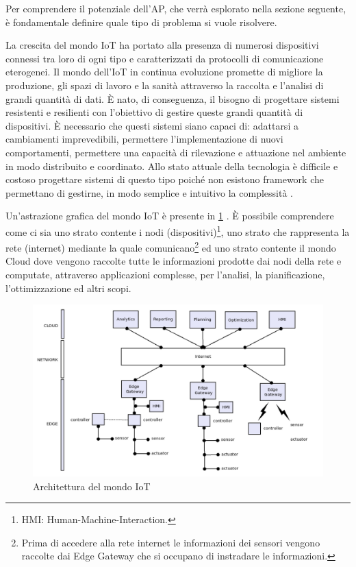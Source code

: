 \documentclass[12pt,a4paper,openright,twoside]{book}
\begin{document}
Per comprendere il potenziale dell'\ac{AP}, che verrà esplorato nella sezione seguente, è fondamentale definire quale tipo di problema si vuole risolvere. 

La crescita del mondo \ac{IoT} ha portato alla presenza di numerosi dispositivi connessi tra loro di ogni tipo e caratterizzati da protocolli di comunicazione eterogenei. Il mondo dell'IoT in continua evoluzione promette di migliore la produzione, gli spazi di lavoro e la sanità attraverso la raccolta e l'analisi di grandi quantità di dati. È nato, di conseguenza, il bisogno di progettare sistemi resistenti e resilienti con l'obiettivo di gestire queste grandi quantità di dispositivi. È necessario che questi sistemi siano capaci di: adattarsi a cambiamenti imprevedibili, permettere l'implementazione di nuovi comportamenti, permettere una capacità di rilevazione e attuazione nel ambiente in modo distribuito e coordinato. Allo stato attuale della tecnologia è difficile e costoso progettare sistemi di questo tipo poiché non esistono framework che permettano di gestirne, in modo semplice e intuitivo la complessità \cite{Beal2015} \cite{CasadeiPhDThesis}.

Un'astrazione grafica del mondo IoT è presente in \cref{fig:iot-arc} \cite{Testa2022}. È possibile comprendere come ci sia uno strato contente i nodi (dispositivi)\footnote{HMI: Human-Machine-Interaction.}, uno strato che rappresenta la rete (internet) mediante la quale comunicano\footnote{Prima di accedere alla rete internet le informazioni dei sensori vengono raccolte dai Edge Gateway che si occupano di instradare le informazioni.} ed uno strato contente il mondo Cloud dove vengono raccolte tutte le informazioni prodotte dai nodi della rete e computate, attraverso applicazioni complesse, per l'analisi, la pianificazione, l'ottimizzazione ed altri scopi.

\begin{figure}
    \centering
    \includegraphics[width=.8\linewidth]{figures/iot-arc.png}
    \caption{Architettura del mondo IoT}
    \label{fig:iot-arc}
\end{figure}
\end{document}
